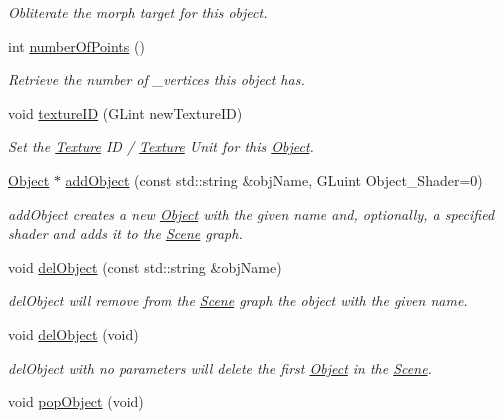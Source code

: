 \begin{DoxyCompactItemize}
\begin{DoxyCompactList}\small\item\em Obliterate the morph target for this object. \end{DoxyCompactList}\item 
int \hyperlink{class_object_a73f1a6210bacf504de9a808009479b81}{number\-Of\-Points} ()
\begin{DoxyCompactList}\small\item\em Retrieve the number of \-\_\-vertices this object has. \end{DoxyCompactList}\item 
void \hyperlink{class_object_a74300b3fa318786e21b65183461c5e25}{texture\-I\-D} (G\-Lint new\-Texture\-I\-D)
\begin{DoxyCompactList}\small\item\em Set the \hyperlink{class_texture}{Texture} I\-D / \hyperlink{class_texture}{Texture} Unit for this \hyperlink{class_object}{Object}. \end{DoxyCompactList}\item 
\hyperlink{class_object}{Object} $\ast$ \hyperlink{class_scene_aa5a48614e959c38c35d824fa9d6a4b8b}{add\-Object} (const std\-::string \&obj\-Name, G\-Luint Object\-\_\-\-Shader=0)
\begin{DoxyCompactList}\small\item\em add\-Object creates a new \hyperlink{class_object}{Object} with the given name and, optionally, a specified shader and adds it to the \hyperlink{class_scene}{Scene} graph. \end{DoxyCompactList}\item 
void \hyperlink{class_scene_a2a6845dacbb468c5c097c7a6ab5a0fe0}{del\-Object} (const std\-::string \&obj\-Name)
\begin{DoxyCompactList}\small\item\em del\-Object will remove from the \hyperlink{class_scene}{Scene} graph the object with the given name. \end{DoxyCompactList}\item 
\hypertarget{class_scene_a2e6b319b60e27e66ad43bb942a6c4424}{void \hyperlink{class_scene_a2e6b319b60e27e66ad43bb942a6c4424}{del\-Object} (void)}\label{class_scene_a2e6b319b60e27e66ad43bb942a6c4424}

\begin{DoxyCompactList}\small\item\em del\-Object with no parameters will delete the first \hyperlink{class_object}{Object} in the \hyperlink{class_scene}{Scene}. \end{DoxyCompactList}\item 
\hypertarget{class_scene_ad6c9d1d1d0c786d39bf97dc60410e28b}{void \hyperlink{class_scene_ad6c9d1d1d0c786d39bf97dc60410e28b}{pop\-Object} (void)}\label{class_scene_ad6c9d1d1d0c786d39bf97dc60410e28b}


\end{DoxyCompactItemize}

